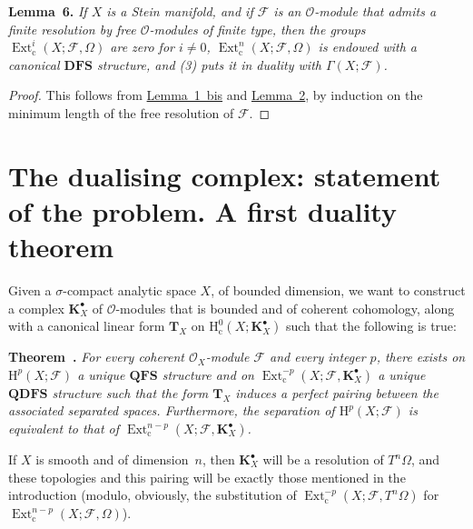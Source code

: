 \documentclass[british]{article}
\newenvironment{itenv}[1]
  {\phantomsection\par\smallskip\noindent\textbf{#1.}\itshape}
  {\par\smallskip}
\newcommand{\oldpage}[1]{\marginpar{\footnotesize$\Big\vert$ \textit{p.~#1}}}
\begin{document}
\protect{}\label{lemma-6}
\begin{itenv}{Lemma 6}
If \(X\) is a Stein manifold, and if \({\mathscr{F}}\) is an
\({\mathscr{O}}\)-module that admits a finite resolution by free
\({\mathscr{O}}\)-modules of finite type, then the groups
\(\operatorname{Ext}_\mathrm{c}^i(X;{\mathscr{F}},\Omega)\) are zero for
\(i\neq0\), \(\operatorname{Ext}_\mathrm{c}^n(X;{\mathscr{F}},\Omega)\)
is endowed with a canonical \(\mathbf{DFS}\) structure, and (3) puts it
in duality with \(\Gamma(X;{\mathscr{F}})\).

\end{itenv}

\begin{proof}
This follows from \hyperref[lemma-1-bis]{Lemma~1~bis} and
\hyperref[lemma-2]{Lemma~2}, by induction on the minimum length of the
free resolution of \({\mathscr{F}}\).
\end{proof}

\section{The dualising complex: statement of the problem. A first
duality theorem}\label{section-3}

\oldpage{81}

Given a \(\sigma\)-compact analytic space \(X\), of bounded dimension,
we want to construct a complex \(\mathbf{K}_X^\bullet\) of
\({\mathscr{O}}\)-modules that is bounded and of coherent cohomology,
along with a canonical linear form \(\mathbf{T}_X\) on
\(\mathrm{H}_\mathrm{c}^0(X;\mathbf{K}_X^\bullet)\) such that the
following is true:

\protect{}\label{theorem-1}
\begin{itenv}{Theorem }
For every coherent \({\mathscr{O}}_X\)-module \({\mathscr{F}}\) and
every integer \(p\), there exists on \(\mathrm{H}^p(X;{\mathscr{F}})\) a
unique \(\mathbf{QFS}\) structure and on
\(\operatorname{Ext}_\mathrm{c}^{-p}(X;{\mathscr{F}},\mathbf{K}_X^\bullet)\)
a unique \(\mathbf{QDFS}\) structure such that the form \(\mathbf{T}_X\)
induces a perfect pairing between the associated separated spaces.
Furthermore, the separation of \(\mathrm{H}^p(X;{\mathscr{F}})\) is
equivalent to that of
\(\operatorname{Ext}_\mathrm{c}^{n-p}(X;{\mathscr{F}},\mathbf{K}_X^\bullet)\).

\end{itenv}

If \(X\) is smooth and of dimension~\(n\), then \(\mathbf{K}_X^\bullet\)
will be a resolution of \(T^n\Omega\), and these topologies and this
pairing will be exactly those mentioned in the introduction (modulo,
obviously, the substitution of
\(\operatorname{Ext}_\mathrm{c}^{-p}(X;{\mathscr{F}},T^n\Omega)\) for
\(\operatorname{Ext}_\mathrm{c}^{n-p}(X;{\mathscr{F}},\Omega)\)).
\end{document}
